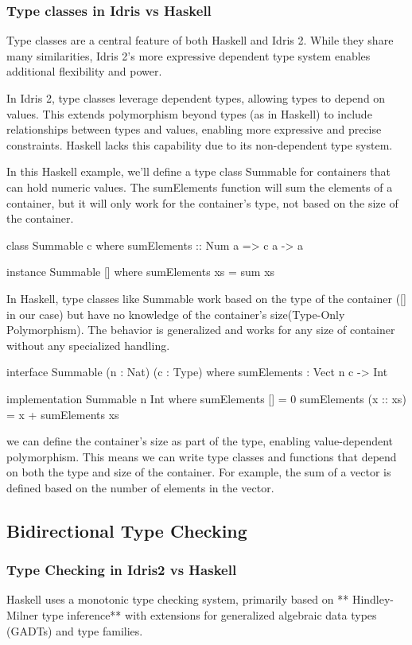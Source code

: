 \documentclass[]{rptuseminar}
\begin{document}
\subsubsection{Type classes in Idris vs Haskell} 
Type classes are a central feature of both Haskell and Idris 2. While they share many similarities, Idris 2's more expressive dependent type system enables additional flexibility and power.

In Idris 2, type classes leverage dependent types, allowing types to depend on values. This extends polymorphism beyond types (as in Haskell) to include relationships between types and values, enabling more expressive and precise constraints. Haskell lacks this capability due to its non-dependent type system.

In this Haskell example, we'll define a type class Summable for containers that can hold numeric values. The sumElements function will sum the elements of a container, but it will only work for the container's type, not based on the size of the container.
\begin{haskell}
  class Summable c where
  sumElements :: Num a => c a -> a

instance Summable [] where
  sumElements xs = sum xs  
\end{haskell}
In Haskell, type classes like Summable work based on the type of the container ([] in our case) but have no knowledge of the container's size(Type-Only Polymorphism). The behavior is generalized and works for any size of container without any specialized handling.
\begin{idris}
    interface Summable (n : Nat) (c : Type) where
    sumElements : Vect n c -> Int  
  
  
    implementation Summable n Int where
    sumElements [] = 0  
    sumElements (x :: xs) = x + sumElements xs  
  
\end{idris}
we can define the container's size as part of the type, enabling value-dependent polymorphism. This means we can write type classes and functions that depend on both the type and size of the container. For example, the sum of a vector is defined based on the number of elements in the vector.
\subsection{Bidirectional Type Checking}
\subsubsection{Type Checking in Idris2 vs Haskell}
Haskell uses a monotonic type checking system, primarily based on ** Hindley-Milner type inference** with extensions for generalized algebraic data types (GADTs) and type families.
\end{document}
